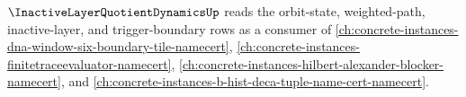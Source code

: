 $\InactiveLayerQuotientDynamicsUp$ reads the orbit-state, weighted-path, inactive-layer, and trigger-boundary rows as a consumer of \autoref{ch:concrete-instances-dna-window-six-boundary-tile-namecert}, \autoref{ch:concrete-instances-finitetraceevaluator-namecert}, \autoref{ch:concrete-instances-hilbert-alexander-blocker-namecert}, and \autoref{ch:concrete-instances-b-hist-deca-tuple-name-cert-namecert}.




